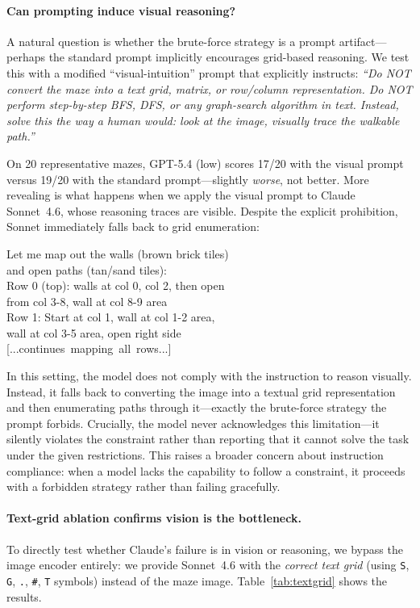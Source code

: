 \documentclass[11pt]{article}
\begin{document}
\paragraph{Can prompting induce visual reasoning?}
A natural question is whether the brute-force strategy is a prompt artifact---perhaps the standard prompt implicitly encourages grid-based reasoning.
We test this with a modified ``visual-intuition'' prompt that explicitly instructs: \emph{``Do NOT convert the maze into a text grid, matrix, or row/column representation. Do NOT perform step-by-step BFS, DFS, or any graph-search algorithm in text. Instead, solve this the way a human would: look at the image, visually trace the walkable path.''}

On 20 representative mazes, GPT-5.4 (low) scores 17/20 with the visual prompt versus 19/20 with the standard prompt---slightly \emph{worse}, not better.
More revealing is what happens when we apply the visual prompt to Claude Sonnet~4.6, whose reasoning traces are visible.
Despite the explicit prohibition, Sonnet immediately falls back to grid enumeration:

\vspace{2pt}
{\small\ttfamily
\noindent Let me map out the walls (brown brick tiles)\\
and open paths (tan/sand tiles):\\
Row 0 (top): walls at col 0, col 2, then open\\
from col 3-8, wall at col 8-9 area\\
Row 1: Start at col 1, wall at col 1-2 area,\\
wall at col 3-5 area, open right side\\
\mbox{[...continues mapping all rows...]}}
\vspace{2pt}

In this setting, the model does not comply with the instruction to reason visually.
Instead, it falls back to converting the image into a textual grid representation and then enumerating paths through it---exactly the brute-force strategy the prompt forbids.
Crucially, the model never acknowledges this limitation---it silently violates the constraint rather than reporting that it cannot solve the task under the given restrictions.
This raises a broader concern about instruction compliance: when a model lacks the capability to follow a constraint, it proceeds with a forbidden strategy rather than failing gracefully.

\paragraph{Text-grid ablation confirms vision is the bottleneck.}
To directly test whether Claude's failure is in vision or reasoning, we bypass the image encoder entirely: we provide Sonnet~4.6 with the \emph{correct text grid} (using \texttt{S}, \texttt{G}, \texttt{.}, \texttt{\#}, \texttt{T} symbols) instead of the maze image.
Table~\ref{tab:textgrid} shows the results.
\end{document}
